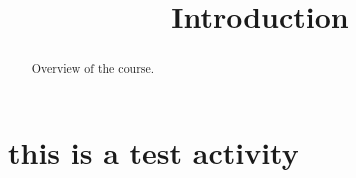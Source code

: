 \documentclass{ximera}
\title{Introduction}
\begin{document}
\begin{abstract}
Overview of the course.
\end{abstract}
\maketitle

\section{this is a test activity}
\end{document}
